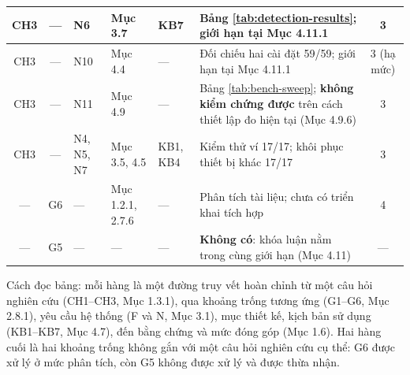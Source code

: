 \begin{longtable}{|c|c|p{2.3cm}|p{1.9cm}|p{1.6cm}|p{2.4cm}|c|}
CH3 & --- & N6
& Mục 3.7
& KB7
& Bảng \ref{tab:detection-results}; giới hạn tại Mục 4.11.1
& 3
\\ \hline

CH3 & --- & N10
& Mục 4.4
& ---
& Đối chiếu hai cài đặt 59/59; giới hạn tại Mục 4.11.1
& 3 (hạ mức)
\\ \hline

CH3 & --- & N11
& Mục 4.9
& ---
& Bảng \ref{tab:bench-sweep}; \textbf{không kiểm chứng được} trên cách thiết lập đo hiện tại (Mục 4.9.6)
& 3
\\ \hline

CH3 & --- & N4, N5, N7
& Mục 3.5, 4.5
& KB1, KB4
& Kiểm thử ví 17/17; khôi phục thiết bị khác 17/17
& 3
\\ \hline

--- & G6 & ---
& Mục 1.2.1, 2.7.6
& ---
& Phân tích tài liệu; chưa có triển khai tích hợp
& 4
\\ \hline

--- & G5 & ---
& ---
& ---
& \textbf{Không có}: khóa luận nằm trong cùng giới hạn (Mục 4.11)
& ---
\\ \hline

\end{longtable}

\noindent Cách đọc bảng: mỗi hàng là một đường truy vết hoàn chỉnh từ một câu hỏi nghiên cứu (CH1--CH3, Mục 1.3.1), qua khoảng trống tương ứng (G1--G6, Mục 2.8.1), yêu cầu hệ thống (F và N, Mục 3.1), mục thiết kế, kịch bản sử dụng (KB1--KB7, Mục 4.7), đến bằng chứng và mức đóng góp (Mục 1.6). Hai hàng cuối là hai khoảng trống không gắn với một câu hỏi nghiên cứu cụ thể: G6 được xử lý ở mức phân tích, còn G5 không được xử lý và được thừa nhận.
